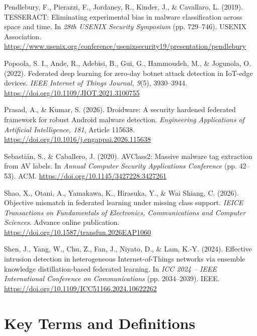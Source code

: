 \documentclass[12pt,letterpaper]{article}
\newenvironment{references}{\begin{list}{}{\setlength{\leftmargin}{0.5in}\setlength{\itemindent}{-0.5in}\setlength{\itemsep}{0pt}\setlength{\parsep}{0pt}\setlength{\topsep}{0pt}}\raggedright}{\end{list}}
\begin{document}
\begin{references}
\item Pendlebury, F., Pierazzi, F., Jordaney, R., Kinder, J., \& Cavallaro, L. (2019). TESSERACT: Eliminating experimental bias in malware classification across space and time. In \textit{28th USENIX Security Symposium} (pp. 729–746). USENIX Association. \url{https://www.usenix.org/conference/usenixsecurity19/presentation/pendlebury}

\item Popoola, S. I., Ande, R., Adebisi, B., Gui, G., Hammoudeh, M., \& Jogunola, O. (2022). Federated deep learning for zero-day botnet attack detection in IoT-edge devices. \textit{IEEE Internet of Things Journal, 9}(5), 3930–3944. \url{https://doi.org/10.1109/JIOT.2021.3100755}

\item Prasad, A., \& Kumar, S. (2026). Droidware: A security hardened federated framework for robust Android malware detection. \textit{Engineering Applications of Artificial Intelligence, 181}, Article 115638. \url{https://doi.org/10.1016/j.engappai.2026.115638}

\item Sebastián, S., \& Caballero, J. (2020). AVClass2: Massive malware tag extraction from AV labels. In \textit{Annual Computer Security Applications Conference} (pp. 42–53). ACM. \url{https://doi.org/10.1145/3427228.3427261}

\item Shao, X., Otani, A., Yamakawa, K., Hirasuka, Y., \& Wai Shiang, C. (2026). Objective mismatch in federated learning under missing class support. \textit{IEICE Transactions on Fundamentals of Electronics, Communications and Computer Sciences}. Advance online publication. \url{https://doi.org/10.1587/transfun.2026EAP1060}

\item Shen, J., Yang, W., Chu, Z., Fan, J., Niyato, D., \& Lam, K.-Y. (2024). Effective intrusion detection in heterogeneous Internet-of-Things networks via ensemble knowledge distillation-based federated learning. In \textit{ICC 2024 – IEEE International Conference on Communications} (pp. 2034–2039). IEEE. \url{https://doi.org/10.1109/ICC51166.2024.10622262}

\end{references}

\clearpage
\section*{Key Terms and Definitions}
\end{document}
